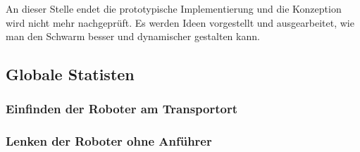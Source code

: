 An dieser Stelle endet die prototypische Implementierung und die Konzeption wird nicht mehr nachgeprüft. Es werden Ideen vorgestellt und ausgearbeitet, wie man den Schwarm besser und dynamischer gestalten kann.

\subsection*{Globale Statisten}
\subsubsection*{Einfinden der Roboter am Transportort}
\subsubsection*{Lenken der Roboter ohne Anführer}

\subsection*{}